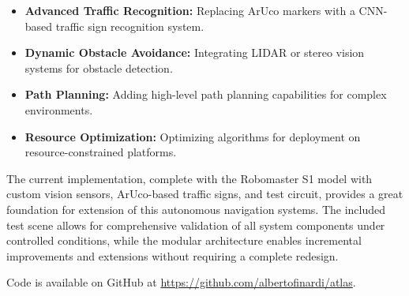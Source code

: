 \documentclass[9pt,technote]{IEEEtran}
\begin{document}
\begin{itemize}
    \item \textbf{Advanced Traffic Recognition:} Replacing ArUco markers with a CNN-based traffic sign recognition system.
    \item \textbf{Dynamic Obstacle Avoidance:} Integrating LIDAR or stereo vision systems for obstacle detection.
    \item \textbf{Path Planning:} Adding high-level path planning capabilities for complex environments.
    \item \textbf{Resource Optimization:} Optimizing algorithms for deployment on resource-constrained platforms.
\end{itemize}

The current implementation, complete with the Robomaster S1 model with custom vision sensors, ArUco-based traffic signs, and test circuit, provides a great foundation for extension of this autonomous navigation systems. The included test scene allows for comprehensive validation of all system components under controlled conditions, while the modular architecture enables incremental improvements and extensions without requiring a complete redesign.

Code is available on GitHub at \url{https://github.com/albertofinardi/atlas}.
\end{document}
